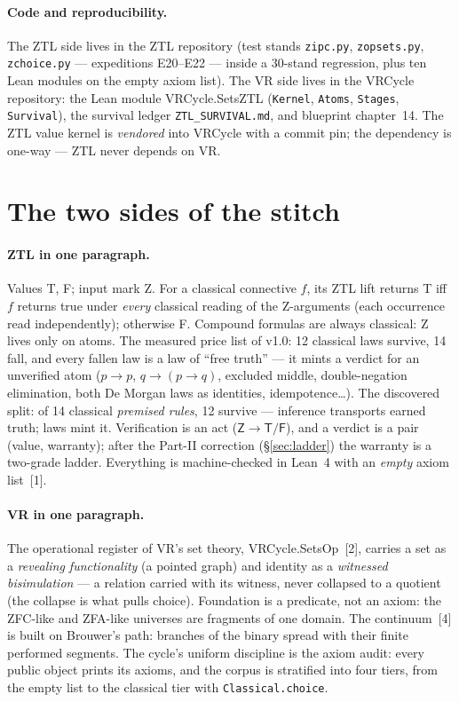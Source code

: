 \documentclass[11pt]{article}
\theoremstyle{remark}
\newcommand{\vT}{\textsf{T}}
\newcommand{\vF}{\textsf{F}}
\newcommand{\vZ}{\textsf{Z}}
\begin{document}
\paragraph{Code and reproducibility.} The ZTL side lives in the ZTL
repository (test stands \texttt{zipc.py}, \texttt{zopsets.py},
\texttt{zchoice.py} --- expeditions E20--E22 --- inside a 30-stand
regression, plus ten Lean modules on the empty axiom list). The VR side
lives in the VRCycle repository: the Lean module \textsf{VRCycle.SetsZTL}
(\texttt{Kernel}, \texttt{Atoms}, \texttt{Stages}, \texttt{Survival}), the
survival ledger \texttt{ZTL\_SURVIVAL.md}, and blueprint chapter~14. The
ZTL value kernel is \emph{vendored} into VRCycle with a commit pin; the
dependency is one-way --- ZTL never depends on VR.

\section{The two sides of the stitch}
\label{sec:sides}

\paragraph{ZTL in one paragraph.} Values \vT{}, \vF{}; input mark \vZ{}. For
a classical connective $f$, its ZTL lift returns \vT{} iff $f$ returns true
under \emph{every} classical reading of the \vZ-arguments (each occurrence
read independently); otherwise \vF{}. Compound formulas are always
classical: \vZ{} lives only on atoms. The measured price list of v1.0: 12
classical laws survive, 14 fall, and every fallen law is a law of ``free
truth'' --- it mints a verdict for an unverified atom ($p\to p$, $q \to
(p \to q)$, excluded middle, double-negation elimination, both De Morgan
laws as identities, idempotence\dots). The discovered split: of 14 classical
\emph{premised rules}, 12 survive --- inference transports earned truth;
laws mint it. Verification is an act ($\vZ \to \vT/\vF$), and a verdict is a
pair (value, warranty); after the Part-II correction (\S\ref{sec:ladder})
the warranty is a two-grade ladder. Everything is machine-checked in Lean~4
with an \emph{empty} axiom list~[1].

\paragraph{VR in one paragraph.} The operational register of VR's set
theory, \textsf{VRCycle.SetsOp}~[2], carries a set as a
\emph{revealing functionality} (a pointed graph) and identity as a
\emph{witnessed bisimulation} --- a relation carried with its witness, never
collapsed to a quotient (the collapse is what pulls choice). Foundation is a
predicate, not an axiom: the ZFC-like and ZFA-like universes are fragments
of one domain. The continuum~[4] is built on Brouwer's path:
branches of the binary spread with their finite performed segments. The
cycle's uniform discipline is the axiom audit: every public object prints
its axioms, and the corpus is stratified into four tiers, from the empty
list to the classical tier with \texttt{Classical.choice}.
\end{document}
